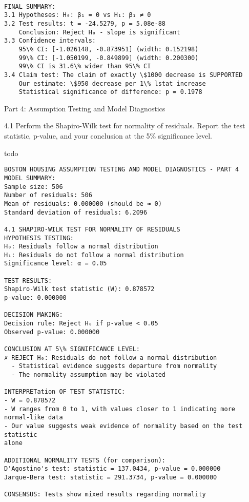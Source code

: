 \documentclass[11pt, twocolumn]{article}
\begin{document}
    \begin{Verbatim}[commandchars=\\\{\}]

FINAL SUMMARY:
3.1 Hypotheses: H₀: β₁ = 0 vs H₁: β₁ ≠ 0
3.2 Test results: t = -24.5279, p = 5.08e-88
    Conclusion: Reject H₀ - slope is significant
3.3 Confidence intervals:
    95\% CI: [-1.026148, -0.873951] (width: 0.152198)
    99\% CI: [-1.050199, -0.849899] (width: 0.200300)
    99\% CI is 31.6\% wider than 95\% CI
3.4 Claim test: The claim of exactly \$1000 decrease is SUPPORTED
    Our estimate: \$950 decrease per 1\% lstat increase
    Statistical significance of difference: p = 0.1978
    \end{Verbatim}

    Part 4: Assumption Testing and Model Diagnostics

    4.1 Perform the Shapiro-Wilk test for normality of residuals. Report the
test statistic, p-value, and your conclusion at the 5\% significance
level.

todo

    \begin{Verbatim}[commandchars=\\\{\}]
BOSTON HOUSING ASSUMPTION TESTING AND MODEL DIAGNOSTICS - PART 4
MODEL SUMMARY:
Sample size: 506
Number of residuals: 506
Mean of residuals: 0.000000 (should be ≈ 0)
Standard deviation of residuals: 6.2096

4.1 SHAPIRO-WILK TEST FOR NORMALITY OF RESIDUALS
HYPOTHESIS TESTING:
H₀: Residuals follow a normal distribution
H₁: Residuals do not follow a normal distribution
Significance level: α = 0.05

TEST RESULTS:
Shapiro-Wilk test statistic (W): 0.878572
p-value: 0.000000

DECISION MAKING:
Decision rule: Reject H₀ if p-value < 0.05
Observed p-value: 0.000000

CONCLUSION AT 5\% SIGNIFICANCE LEVEL:
✗ REJECT H₀: Residuals do not follow a normal distribution
  - Statistical evidence suggests departure from normality
  - The normality assumption may be violated

INTERPRETation OF TEST STATISTIC:
- W = 0.878572
- W ranges from 0 to 1, with values closer to 1 indicating more normal-like data
- Our value suggests weak evidence of normality based on the test statistic
alone

ADDITIONAL NORMALITY TESTS (for comparison):
D'Agostino's test: statistic = 137.0434, p-value = 0.000000
Jarque-Bera test: statistic = 291.3734, p-value = 0.000000

CONSENSUS: Tests show mixed results regarding normality
    \end{Verbatim}
\end{document}
